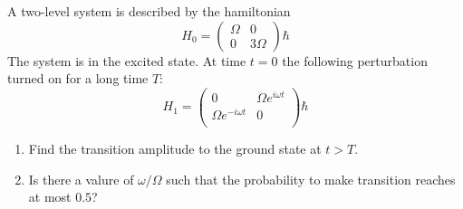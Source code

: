 \begin{esercizio}[(13/07/2018 n°2)]
   A two-level system is described by the hamiltonian
   \begin{equation*}
      H_0=
      \begin{pmatrix}
         \Omega & 0\\
         0 & 3\Omega
      \end{pmatrix}
      \hbar
   \end{equation*}
   The system is in the excited state. At time $t=0$ the following perturbation turned on for a long time $T$:
   \begin{equation*}
      H_1=
      \begin{pmatrix}
         0 & \Omega e^{i\omega t}\\
         \Omega e^{-i\omega t} & 0\\
      \end{pmatrix}
      \hbar
   \end{equation*}
   \begin{enumerate}[label=\alph*), leftmargin=0.6cm]
      \item Find the transition amplitude to the ground state at $t>T$.
      \item Is there a valure of $\omega/\Omega$ such that the probability to make transition reaches at most $0.5$?
   \end{enumerate}
\end{esercizio}
